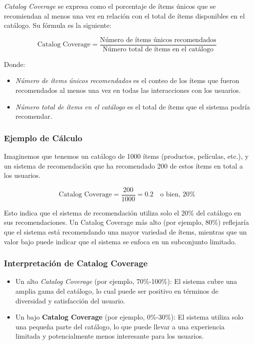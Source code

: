\documentclass[11pt,a4paper,twoside]{thesis}
\begin{document}
\textit{Catalog Coverage} se expresa como el porcentaje de ítems únicos que se recomiendan al menos una vez en relación con el total de ítems disponibles en el catálogo. Su fórmula es la siguiente:

\[
	\text{Catalog Coverage} = \frac{\text{Número de ítems únicos recomendados}}{\text{Número total de ítems en el catálogo}}
\]

Donde:
\begin{itemize}
	\item \textit{Número de ítems únicos recomendados} es el conteo de los ítems que fueron recomendados al menos una vez en todas las interacciones con los usuarios.
	\item \textit{Número total de ítems en el catálogo} es el total de ítems que el sistema podría recomendar.
\end{itemize}

\subsubsection{Ejemplo de Cálculo}

Imaginemos que tenemos un catálogo de 1000 ítems (productos, películas, etc.), y un sistema de recomendación que ha recomendado 200 de estos ítems en total a los usuarios.

\[
	\text{Catalog Coverage} = \frac{200}{1000} = 0.2 \quad \text{o bien, } 20\%
\]

Esto indica que el sistema de recomendación utiliza solo el 20\% del catálogo en sus recomendaciones. Un Catalog Coverage más alto (por ejemplo, 80\%) reflejaría que el sistema está recomendando una mayor variedad de ítems, mientras que un valor bajo puede indicar que el sistema se enfoca en un subconjunto limitado.

\subsubsection{Interpretación de Catalog Coverage}

\begin{itemize}
	\item Un alto \textit{Catalog Coverage} (por ejemplo, 70\%-100\%): El sistema cubre una amplia gama del catálogo, lo cual puede ser positivo en términos de diversidad y satisfacción del usuario.
	\item Un bajo \textbf{Catalog Coverage} (por ejemplo, 0\%-30\%): El sistema utiliza solo una pequeña parte del catálogo, lo que puede llevar a una experiencia limitada y potencialmente menos interesante para los usuarios.
\end{itemize}
\end{document}
